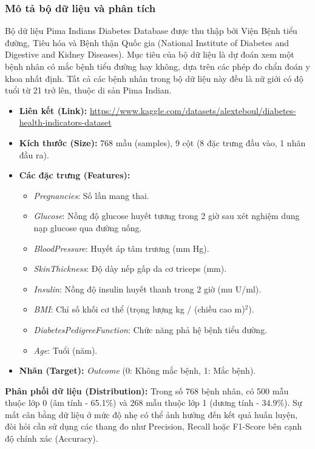 \documentclass[12pt,a4paper]{article}
\begin{document}
\subsubsection{Mô tả bộ dữ liệu và phân tích}
Bộ dữ liệu Pima Indians Diabetes Database được thu thập bởi Viện Bệnh tiểu đường, Tiêu hóa và Bệnh thận Quốc gia (National Institute of Diabetes and Digestive and Kidney Diseases). Mục tiêu của bộ dữ liệu là dự đoán xem một bệnh nhân có mắc bệnh tiểu đường hay không, dựa trên các phép đo chẩn đoán y khoa nhất định. Tất cả các bệnh nhân trong bộ dữ liệu này đều là nữ giới có độ tuổi từ 21 trở lên, thuộc di sản Pima Indian.
\begin{itemize}
    \item \textbf{Liên kết (Link):} \url{https://www.kaggle.com/datasets/alexteboul/diabetes-health-indicators-dataset}
    \item \textbf{Kích thước (Size):} 768 mẫu (samples), 9 cột (8 đặc trưng đầu vào, 1 nhãn đầu ra).
    \item \textbf{Các đặc trưng (Features):}
    \begin{itemize}
        \item \textit{Pregnancies}: Số lần mang thai.
        \item \textit{Glucose}: Nồng độ glucose huyết tương trong 2 giờ sau xét nghiệm dung nạp glucose qua đường uống.
        \item \textit{BloodPressure}: Huyết áp tâm trương (mm Hg).
        \item \textit{SkinThickness}: Độ dày nếp gấp da cơ triceps (mm).
        \item \textit{Insulin}: Nồng độ insulin huyết thanh trong 2 giờ (mu U/ml).
        \item \textit{BMI}: Chỉ số khối cơ thể (trọng lượng kg / (chiều cao m)$^2$).
        \item \textit{DiabetesPedigreeFunction}: Chức năng phả hệ bệnh tiểu đường.
        \item \textit{Age}: Tuổi (năm).
    \end{itemize}
    \item \textbf{Nhãn (Target):} \textit{Outcome} (0: Không mắc bệnh, 1: Mắc bệnh).
\end{itemize}

\textbf{Phân phối dữ liệu (Distribution):}
Trong số 768 bệnh nhân, có 500 mẫu thuộc lớp 0 (âm tính - 65.1\%) và 268 mẫu thuộc lớp 1 (dương tính - 34.9\%). Sự mất cân bằng dữ liệu ở mức độ nhẹ có thể ảnh hưởng đến kết quả huấn luyện, đòi hỏi cần sử dụng các thang đo như Precision, Recall hoặc F1-Score bên cạnh độ chính xác (Accuracy).
\end{document}
